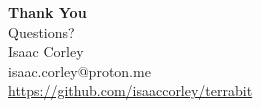 \documentclass[aspectratio=169,10pt]{beamer}
\begin{document}
{
\begin{frame}[plain]
	\vfill
	\begin{center}
		{\Large\bfseries\color{white}Thank You}\\[16pt]
		{\normalsize\color{Accent}Questions?}\\[24pt]
		{\small\color{white!70}Isaac Corley}\\[4pt]
		{\footnotesize\color{white!50}isaac.corley@proton.me}\\[12pt]
		{\footnotesize\color{Accent}\url{https://github.com/isaaccorley/terrabit}}
	\end{center}
	\vfill
\end{frame}
}
\end{document}
